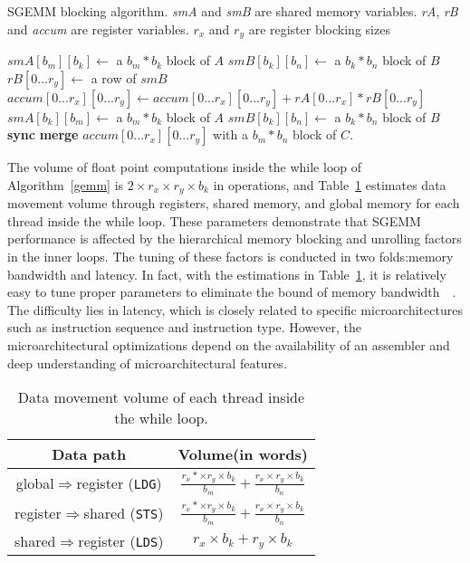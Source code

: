 \begin{algorithm}
  \caption{SGEMM blocking algorithm. {\em smA} and {\em smB} are shared memory variables. {\em rA}, {\em rB} and {\em 
accum} are register variables. $r_x$ and $r_y$ are register blocking sizes}
  \label{gemm}
  \begin{algorithmic}[1]
	\State $smA[b_m][b_k] \gets$ a $b_m * b_k$ block of $A$
	\State $smB[b_k][b_n] \gets$ a $b_k * b_n$ block of $B$
	\Do
      \State {\color {black} {$rA[0...r_x]\gets$ a column of $smA$}}
	\State $rB[0...r_y]\gets$ a row of $smB$
	\State $accum[0...r_x][0...r_y]\gets accum[0...r_x][0...r_y]+rA[0...r_x]*rB[0...r_y]$
	\EndFor
	\State $smA[b_k][b_m]\gets$ a $b_m*b_k$ block of $A$
	\State $smB[b_k][b_n]\gets$ a $b_k*b_n$ block of $B$
	\State \textbf{sync}
	\State \textbf{merge} $accum[0...r_x][0...r_y]$ with a $b_m*b_n$ block of $C$.
  \end{algorithmic}
\end{algorithm}

The volume of float point computations inside the while loop of Algorithm~\ref{gemm} is $2\times r_x\times r_y \times b_k$ 
in operations, and Table~\ref{tab:dm} estimates data movement volume through registers, shared memory, and global 
memory for each thread inside the while loop.
These parameters demonstrate that SGEMM performance is affected by the hierarchical memory blocking and unrolling 
factors in the inner loops.
The tuning of these factors is conducted in two folds:memory bandwidth and latency. In fact, with the estimations in 
Table~\ref{tab:dm}, it is relatively easy to tune proper parameters to eliminate the bound of memory 
bandwidth~\cite{magma}~\cite{tan}. The difficulty lies in latency, which is closely related to specific 
microarchitectures such as instruction sequence and instruction type. However, the microarchitectural 
optimizations depend on the availability of an assembler and deep understanding of microarchitectural features.

\begin{table}[htbp]
    \caption{Data movement volume of each thread inside the while loop.} %
\centering
\scalebox{1.0} {
\begin{tabular}{|c|c|}
\hline
    Data path& Volume(in words)\\
\hline
    global$\Rightarrow$register ({\tt LDG})& $\frac{r_x*\times r_y \times b_k}{b_m} + \frac{r_x\times r_y \times b_k}{b_n}$ \\
\hline
register$\Rightarrow$shared ({\tt STS})& $\frac{r_x*\times r_y \times b_k}{b_m} + \frac{r_x\times r_y \times b_k}{b_n}$ \\
\hline
shared$\Rightarrow$register ({\tt LDS})& $r_x\times b_k + r_y\times b_k$\\
\hline
\end{tabular}
}
\label{tab:dm}
\end{table}
